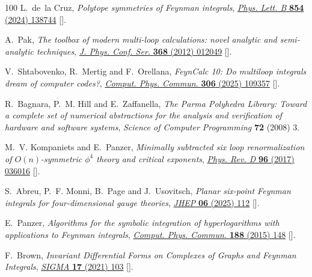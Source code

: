 \documentclass[12pt,a4paper]{article}
\theoremstyle{plain}
\theoremstyle{remark}
\begin{document}
\begin{thebibliography}{100}
L.~de~la Cruz, \emph{{Polytope symmetries of Feynman integrals}},
  \href{https://doi.org/10.1016/j.physletb.2024.138744}{\emph{Phys. Lett. B}
  {\bfseries 854} (2024) 138744}
  [\href{https://arxiv.org/abs/2404.03564}{{}}].

A.~Pak, \emph{{The toolbox of modern multi-loop calculations: novel analytic
  and semi-analytic techniques}},
  \href{https://doi.org/10.1088/1742-6596/368/1/012049}{\emph{J. Phys. Conf.
  Ser.} {\bfseries 368} (2012) 012049}
  [\href{https://arxiv.org/abs/1111.0868}{{}}].

V.~Shtabovenko, R.~Mertig and F.~Orellana, \emph{{FeynCalc 10: Do multiloop
  integrals dream of computer codes?}},
  \href{https://doi.org/10.1016/j.cpc.2024.109357}{\emph{Comput. Phys. Commun.}
  {\bfseries 306} (2025) 109357}
  [\href{https://arxiv.org/abs/2312.14089}{{}}].

R.~Bagnara, P.~M. Hill and E.~Zaffanella, \emph{The {Parma Polyhedra Library}:
  Toward a complete set of numerical abstractions for the analysis and
  verification of hardware and software systems}, {\emph{Science of Computer
  Programming} {\bfseries 72} (2008) 3}.

M.~V. Kompaniets and E.~Panzer, \emph{{Minimally subtracted six loop
  renormalization of $O(n)$-symmetric $\phi^4$ theory and critical exponents}},
  \href{https://doi.org/10.1103/PhysRevD.96.036016}{\emph{Phys. Rev. D}
  {\bfseries 96} (2017) 036016}
  [\href{https://arxiv.org/abs/1705.06483}{{}}].

S.~Abreu, P.~F. Monni, B.~Page and J.~Usovitsch, \emph{{Planar six-point
  Feynman integrals for four-dimensional gauge theories}},
  \href{https://doi.org/10.1007/JHEP06(2025)112}{\emph{JHEP} {\bfseries 06}
  (2025) 112} [\href{https://arxiv.org/abs/2412.19884}{{}}].

E.~Panzer, \emph{{Algorithms for the symbolic integration of hyperlogarithms
  with applications to Feynman integrals}},
  \href{https://doi.org/10.1016/j.cpc.2014.10.019}{\emph{Comput. Phys. Commun.}
  {\bfseries 188} (2015) 148}
  [\href{https://arxiv.org/abs/1403.3385}{{}}].

F.~Brown, \emph{{Invariant Differential Forms on Complexes of Graphs and
  Feynman Integrals}},
  \href{https://doi.org/10.3842/SIGMA.2021.103}{\emph{SIGMA} {\bfseries 17}
  (2021) 103} [\href{https://arxiv.org/abs/2101.04419}{{}}].


\end{thebibliography}
\end{document}

